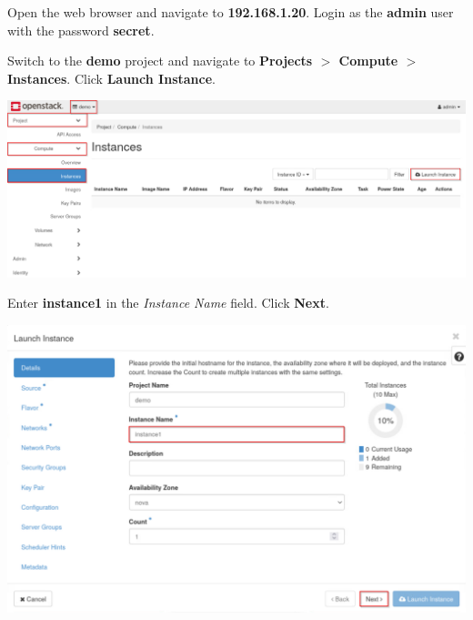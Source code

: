 \documentclass[letterpaper, 12pt]{article}
\begin{document}
\begin{enumerate}
    \begin{labstep}
        Open the web browser and navigate to \textbf{192.168.1.20}.
        Login as the \textbf{admin} user with the password \textbf{secret}.
    \end{labstep}

    \begin{labstep}
        Switch to the \textbf{demo} project and navigate to \textbf{Projects $>$ Compute $>$ Instances}.
        Click \textbf{Launch Instance}.

        \begin{center}
            \includegraphics[width=\linewidth]{images/part4/step2.png}
        \end{center}
    \end{labstep}

    \begin{labstep}
        Enter \textbf{instance1} in the \textit{Instance Name} field.
        Click \textbf{Next}.

        \begin{center}
            \includegraphics[width=\linewidth]{images/part4/step3.png}
        \end{center}
    \end{labstep}


\end{enumerate}
\end{document}
